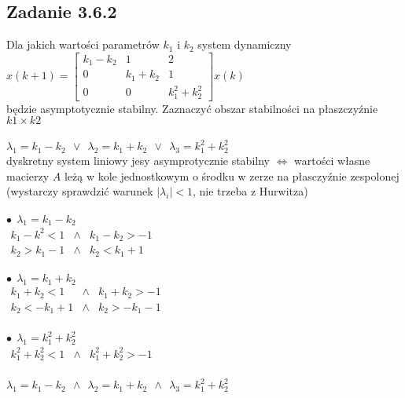 \subsection*{Zadanie 3.6.2} {\color{darkgray}
	Dla jakich wartości parametrów $k_1$ i $k_2$ system dynamiczny\\
	$x(k+1)=\left[ \begin{array}{ccc}    k_1-k_2 & 1 & 2 \\ 0 & k_1+k_2 & 1 \\ 0 & 0 & k_1^2+k_2^2    \end{array}\right]x(k)$\\
	będzie asymptotycznie stabilny. Zaznaczyć obszar stabilności na płaszczyźnie $k1 \times k2$
}\\\\
$\lambda_1 = k_1-k_2 \ \ \vee \  \ \lambda_2=k_1+k_2 \ \ \vee \ \ \lambda_3=k_1^2+k_2^2$\\
dyskretny system liniowy jesy asymprotycznie stabilny $\Leftrightarrow$ wartości własne macierzy $A$ leżą w kole jednostkowym o środku w zerze na płasczyźnie zespolonej (wystarczy sprawdzić warunek $|\lambda_i|<1$, nie trzeba z Hurwitza)\\
\\
$\bullet\ \ \lambda_1 = k_1-k_2 $\\
$\begin{array}{ccc}   k_1-k^2<1 & \wedge &k_1-k_2>-1 \\ k_2>k_1-1 & \wedge & k_2<k_1+1    \end{array}$\\
\\
$\bullet\ \ \lambda_1 =k_1+k_2$\\
$\begin{array}{ccc}  k_1+k_2<1 & \wedge & k_1+k_2>-1 \\ k_2<-k_1+1 & \wedge & k_2>-k_1-1    \end{array}$\\
\\
$\bullet\ \ \lambda_1 =k_1^2+k_2^2$\\
$\begin{array}{ccc}  k_1^2+k_2^2<1 &\wedge & k_1^2+k_2^2>-1  \end{array}$\\
\\
$\lambda_1 = k_1-k_2 \ \ \wedge \  \ \lambda_2=k_1+k_2 \ \ \wedge \ \ \lambda_3=k_1^2+k_2^2$\\


